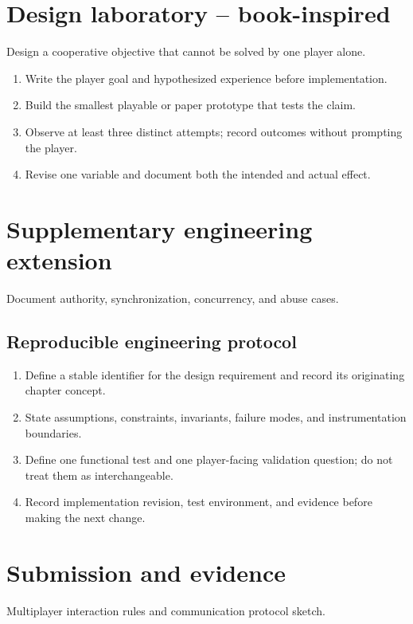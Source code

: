 \documentclass[11pt]{article}
\begin{document}
\section{Design laboratory -- book-inspired}
Design a cooperative objective that cannot be solved by one player alone.

\begin{enumerate}
\item Write the player goal and hypothesized experience before implementation.
\item Build the smallest playable or paper prototype that tests the claim.
\item Observe at least three distinct attempts; record outcomes without prompting the player.
\item Revise one variable and document both the intended and actual effect.
\end{enumerate}

\section{Supplementary engineering extension}
Document authority, synchronization, concurrency, and abuse cases.


\subsection{Reproducible engineering protocol}
\begin{enumerate}
\item Define a stable identifier for the design requirement and record its originating chapter concept.
\item State assumptions, constraints, invariants, failure modes, and instrumentation boundaries.
\item Define one functional test and one player-facing validation question; do not treat them as interchangeable.
\item Record implementation revision, test environment, and evidence before making the next change.
\end{enumerate}

\section{Submission and evidence}
Multiplayer interaction rules and communication protocol sketch.
\end{document}
